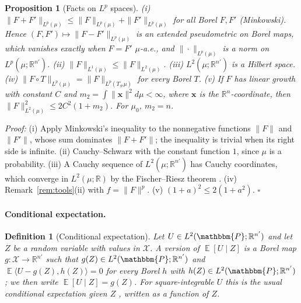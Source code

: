 \documentclass{article}
\DeclareMathOperator{\E}{\mathbb{E}}
\newcommand{\RR}{\mathbb{R}}
\newcommand{\PP}{\mathbbm{P}}
\newcommand{\bx}{\mathbf{x}}
\theoremstyle{plain}
\newtheorem{proposition}[theorem]{Proposition}
\newtheorem{definition}[theorem]{Definition}
\theoremstyle{remark}
\begin{document}
\begin{proposition}[Facts on $L^p$ spaces]\label{pr:lp}
(i) $\|F+F'\|_{L^p(\mu)}\le\|F\|_{L^p(\mu)}+\|F'\|_{L^p(\mu)}$ for all Borel $F,F'$ (Minkowski). Hence $(F,F')\mapsto\|F-F'\|_{L^p(\mu)}$ is an extended
pseudometric on Borel maps, which vanishes exactly when $F=F'$ $\mu$-a.e., and $\|\cdot\|_{L^p(\mu)}$ is a norm on $L^p(\mu;\RR^{n'})$.
(ii) $\|F\|_{L^1(\mu)}\le\|F\|_{L^2(\mu)}$.
(iii) $L^2(\mu;\RR^{n'})$ is a Hilbert space.
(iv) $\|F\circ T\|_{L^p(\mu)}=\|F\|_{L^p(T_\#\mu)}$ for every Borel $T$.
(v) If $F$ has linear growth with constant $C$ and $m_2=\int\|\bx\|^2d\mu<\infty$, where $\bx$ is the $\RR^n$-coordinate, then
$\|F\|^2_{L^2(\mu)}\le2C^2(1+m_2)$. For $\mu_0$, $m_2=n$.
\end{proposition}
\textit{Proof:}
(i) Apply Minkowski's inequality \citep[Thm.~4.7]{brezis2011functional} to the nonnegative functions $\|F\|$ and $\|F'\|$, whose sum dominates
$\|F+F'\|$; the inequality is trivial when its right side is infinite. (ii) Cauchy--Schwarz with the constant function $1$, since $\mu$ is a
probability. (iii) A Cauchy sequence of $L^2(\mu;\RR^{n'})$ has Cauchy coordinates, which converge in $L^2(\mu;\RR)$ by the Fischer--Riesz
theorem \citep[Thm.~4.8]{brezis2011functional}. (iv) Remark~\ref{rem:tools}(ii) with $f=\|F\|^p$. (v) $(1+a)^2\le2(1+a^2)$. \hfill$\square$

\paragraph{Conditional expectation.}

\begin{definition}[Conditional expectation]\label{def:condexp}
Let $U\in L^2(\PP;\RR^{n'})$ and let $Z$ be a random variable with values in $\mathcal X$. A \emph{version} of $\E[U\mid Z]$ is a Borel map
$g:\mathcal X\to\RR^{n'}$ such that $g(Z)\in L^2(\PP;\RR^{n'})$ and $\E\langle U-g(Z),h(Z)\rangle=0$ for every Borel $h$ with $h(Z)\in L^2(\PP;\RR^{n'})$; we
then write $\E[U\mid Z]=g(Z)$. For square-integrable $U$ this is the usual conditional expectation given $Z$
\citep[Ch.~9]{williams1991probability}, written as a function of $Z$.
\end{definition}
\end{document}
